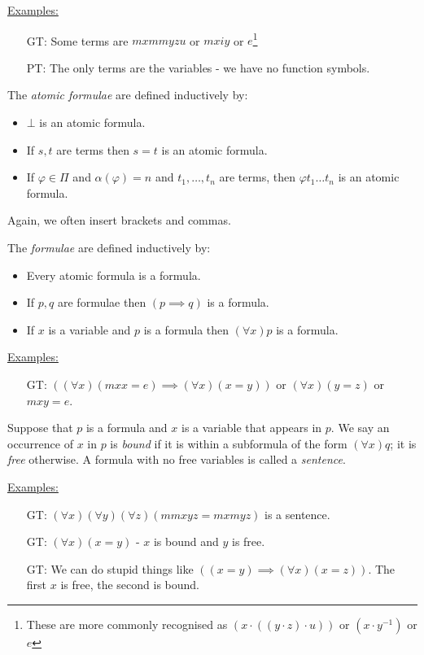 \documentclass[10pt,a4paper]{article}
\begin{document}
\hspace*{-1em}\underline{Examples:}
\begin{itemize}
\item[GT:] Some terms are $mxmmyzu$ or $mxiy$ or $e$\footnote{These are more commonly recognised as $(x\cdot ((y\cdot z)\cdot u))$ or $(x\cdot y^{-1})$ or $e$}
\item[PT:] The only terms are the variables - we have no function symbols.
\end{itemize}

The \emph{atomic formulae} are defined inductively by:
\begin{itemize}
\item $\bot$ is an atomic formula.
\item If $s,t$ are terms then $s=t$ is an atomic formula.
\item If $\varphi \in \Pi$ and $\alpha(\varphi) = n$ and $t_1,\ldots, t_n$ are terms, then $\varphi t_1\ldots t_n$ is an atomic formula.
\end{itemize}
Again, we often insert brackets and commas.

The \emph{formulae} are defined inductively by:
\begin{itemize}
\item Every atomic formula is a formula.
\item If $p,q$ are formulae then $(p \implies q)$ is a formula.
\item If $x$ is a variable and $p$ is a formula then $(\forall x)p$ is a formula.
\end{itemize}

\hspace*{-1em}\underline{Examples:}
\begin{itemize}
\item[GT:] $\left((\forall x)(mxx = e)\implies (\forall x)(x=y)\right)$ or $(\forall x)(y=z)$ or $mxy = e$.
\end{itemize}
 
Suppose that $p$ is a formula and $x$ is a variable that appears in $p$. We say an occurrence of $x$ in $p$ is \emph{bound} if it is within a subformula of the form $(\forall x)q$; it is \emph{free} otherwise. A formula with no free variables is called a \emph{sentence}.

\hspace*{-1em}\underline{Examples:}
\begin{itemize}
\item[GT:] $(\forall x)(\forall y)(\forall z)(mmxyz = mxmyz)$ is a sentence.
\item[GT:] $(\forall x)(x=y)$ - $x$ is bound and $y$ is free.
\item[GT:] We can do stupid things like $((x=y)\implies (\forall x)(x=z))$. The first $x$ is free, the second is bound.
\end{itemize}
\end{document}
